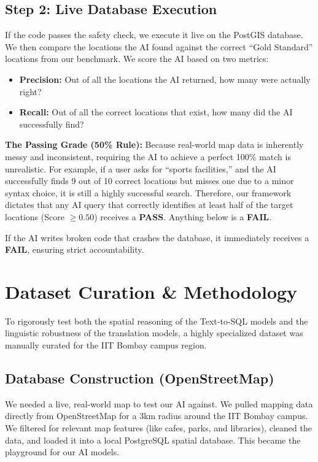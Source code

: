 \documentclass[11pt,a4paper]{article}
\begin{document}
\subsection{Step 2: Live Database Execution}
If the code passes the safety check, we execute it live on the PostGIS database. We then compare the locations the AI found against the correct ``Gold Standard'' locations from our benchmark.
We score the AI based on two metrics:
\begin{itemize}
    \item \textbf{Precision:} Out of all the locations the AI returned, how many were actually right?
    \item \textbf{Recall:} Out of all the correct locations that exist, how many did the AI successfully find?
\end{itemize}
\textbf{The Passing Grade (50\% Rule):} Because real-world map data is inherently messy and inconsistent, requiring the AI to achieve a perfect 100\% match is unrealistic. For example, if a user asks for ``sports facilities,'' and the AI successfully finds 9 out of 10 correct locations but misses one due to a minor syntax choice, it is still a highly successful search. Therefore, our framework dictates that any AI query that correctly identifies at least half of the target locations (Score $\ge 0.50$) receives a \textbf{PASS}. Anything below is a \textbf{FAIL}.

If the AI writes broken code that crashes the database, it immediately receives a \textbf{FAIL}, ensuring strict accountability.

\section{Dataset Curation \& Methodology}

To rigorously test both the spatial reasoning of the Text-to-SQL models and the linguistic robustness of the translation models, a highly specialized dataset was manually curated for the IIT Bombay campus region.

\subsection{Database Construction (OpenStreetMap)}
We needed a live, real-world map to test our AI against. We pulled mapping data directly from OpenStreetMap for a 3km radius around the IIT Bombay campus. We filtered for relevant map features (like cafes, parks, and libraries), cleaned the data, and loaded it into a local PostgreSQL spatial database. This became the playground for our AI models.
\end{document}
